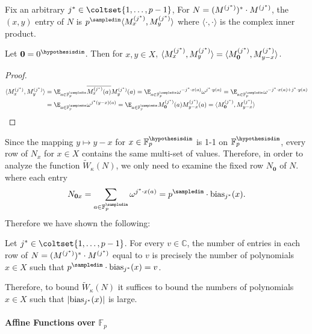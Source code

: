 \begin{sloppypar}
Fix an arbitrary $j^*\in \coltset{1,\ldots,p-1}$,
For $N=(M^{(j^*)})^*\cdot M^{(j^*)}$, the $(x,y)$ entry of $N$ is $p^\sampledim \langle \mjs_x,\mjs_y\rangle$
where $\langle \cdot,\cdot\rangle$ is the complex inner product.
\end{sloppypar}

\begin{proposition}
\label{c-prop:equalrows}
Let $\mathbf{0}=0^\hypothesisdim$.
Then for $x,y\in X$,
$\langle M^{(j^*)}_x,M^{(j^*)}_y\rangle=\langle M^{(j^*)}_{\mathbf{0}},M^{(j^*)}_{y-x}\rangle$.
\end{proposition}

\begin{proof}
\begin{align*}
\langle \mjs_x,\mjs_y\rangle&=\E_{a\in \mathbb{F}_p^\sampledim} \overline {\mjs_x(a)}\mjs_y(a)
=\E_{a\in \mathbb{F}_p^\sampledim} \omega^{-j^*\cdot x(a)}\omega^{j^*\cdot y(a)}
=\E_{a\in \mathbb{F}_p^\sampledim} \omega^{-j^*\cdot x(a)+j^*\cdot y(a)}\\
&=\E_{a\in \mathbb{F}_p^\sampledim} \omega^{j^*(y-x)(a)}
=\E_{a\in \mathbb{F}_p^\sampledim} \mjs_{\mathbf{0}}(a)\mjs_{y-x}(a)
=\langle \mjs_{\mathbf{0}},\mjs_{y-x}\rangle
\end{align*}
\end{proof}

Since the mapping $y\mapsto y-x$ for $x\in \mathbb{F}_p^\hypothesisdim$ is
1-1 on $\mathbb{F}_p^\hypothesisdim$, 
every row of $N_x$ for $x\in X$ contains the same multi-set of values.
Therefore, in order to analyze the function $\tilde W_\kappa(N)$,
we only need to examine the fixed row $N_\mathbf{0}$ of $N$.
where each entry
$$N_{\mathbf{0}x}=\sum_{a\in \mathbb{F}_p^\sampledim}\omega^{j^*\cdot x(a)}=p^\sampledim\cdot \biasjs(x).$$
Therefore we have shown the following:

\begin{lemma}
\label{lem:matrix-bias}
Let $j^*\in \coltset{1,\ldots,p-1}$.  For every $v\in \mathbb{C}$, the number of
entries in each row of $N=(M^{(j^*)})^*\cdot M^{(j^*)}$ equal to $v$ is precisely
the number of polynomials $x\in X$ such that $p^\sampledim\cdot \biasjs(x)=v$. 
\end{lemma}

Therefore, to bound $\tilde W_\kappa(N)$ it suffices to bound the numbers of
polynomials $x\in X$ such that $|\mathrm{bias}_{j^*}(x)|$ is large.

\paragraph{Affine Functions over $\mathbb{F}_p$}

